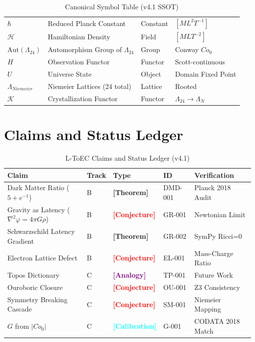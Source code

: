 \documentclass[11pt,titlepage]{article}
\newcommand{\leech}{\Lambda_{24}}
\newcommand{\tagtheo}{\textcolor{green!60!black}{\textbf{[Theorem]}} }
\newcommand{\tagconj}{\textcolor{red}{\textbf{[Conjecture]}} }
\newcommand{\taganal}{\textcolor{purple}{\textbf{[Analogy]}} }
\newcommand{\tagcal}{\textcolor{cyan}{\textbf{[Calibration]}} }
\begin{document}
\begin{table}[h!]
\begin{tabular}{@{}llll@{}}
$\hbar$ & Reduced Planck Constant & Constant & $[M L^2 T^{-1}]$ \\
$\mathcal{H}$ & Hamiltonian Density & Field & $[M L T^{-2}]$ \\
$\text{Aut}(\leech)$ & Automorphism Group of $\leech$ & Group & Conway $Co_0$ \\
$H$ & Observation Functor & Functor & Scott-continuous \\
$U$ & Universe State & Object & Domain Fixed Point \\
$\Lambda_{Niemeier}$ & Niemeier Lattices (24 total) & Lattice & Rooted \\
$\mathcal{K}$ & Crystallization Functor & Functor & $\leech \to \Lambda_N$ \\ \bottomrule
\end{tabular}
\caption{Canonical Symbol Table (v4.1 SSOT)}
\end{table}

\newpage
\tableofcontents
\newpage

\section{Claims and Status Ledger}
\begin{table}[h!]
\centering
\begin{tabular}{@{}lllll@{}}
\toprule
\textbf{Claim} & \textbf{Track} & \textbf{Type} & \textbf{ID} & \textbf{Verification} \\ \midrule
Dark Matter Ratio ($5+e^{-1}$) & B & \tagtheo & DMD-001 & Planck 2018 Audit \\
Gravity as Latency ($\nabla^2 \varphi = 4\pi G \rho$) & B & \tagconj & GR-001 & Newtonian Limit \\
Schwarzschild Latency Gradient & B & \tagtheo & GR-002 & SymPy Ricci=0 \\
Electron Lattice Defect & B & \tagconj & EL-001 & Mass-Charge Ratio \\
Topos Dictionary & C & \taganal & TP-001 & Future Work \\
Ouroboric Closure & C & \tagconj & OU-001 & Z3 Consistency \\
Symmetry Breaking Cascade & C & \tagconj & SM-001 & Niemeier Mapping \\
$G$ from $|Co_0|$ & C & \tagcal & G-001 & CODATA 2018 Match \\ \bottomrule
\end{tabular}
\caption{L-ToEC Claims and Status Ledger (v4.1)}
\end{table}
\end{document}
